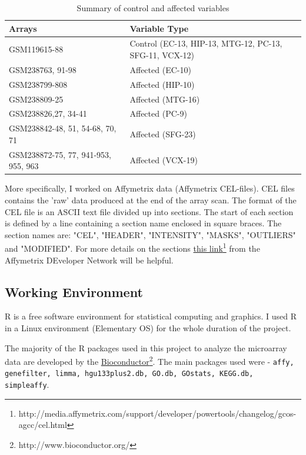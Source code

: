 \documentclass[oneside, a4paper, 11pt]{book}
\begin{document}
\begin{table}[h]
    \centering
    \begin{tabular}{ |l|p{}| }
        \hline
        Arrays & Variable Type\\
        \hline
        GSM119615-88 & Control (EC-13, HIP-13, MTG-12, PC-13, SFG-11, VCX-12)\\  
        GSM238763, 91-98 & Affected (EC-10) \\
        GSM238799-808 & Affected (HIP-10) \\
        GSM238809-25 & Affected (MTG-16) \\
        GSM238826,27, 34-41 & Affected (PC-9) \\
        GSM238842-48, 51, 54-68, 70, 71 & Affected (SFG-23) \\
        GSM238872-75, 77, 941-953, 955, 963 & Affected (VCX-19)\\
        \hline
    \end{tabular}
    \caption{Summary of control and affected variables}
    \label{vartab}
\end{table}

More specifically, I worked on Affymetrix data (Affymetrix CEL-files). CEL files contains the 'raw' data produced at the end of the array scan. The format of the CEL file is an ASCII text file divided up into sections. The start of each section is defined by a line containing a section name enclosed in square braces. The section names are: "CEL", "HEADER", "INTENSITY", "MASKS", "OUTLIERS" and "MODIFIED". For more details on the sections \href{http://media.affymetrix.com/support/developer/powertools/changelog/gcos-agcc/cel.html}{this link}\footnote{http://media.affymetrix.com/support/developer/powertools/changelog/gcos-agcc/cel.html} from the Affymetrix DEveloper Network will be helpful.

\subsection{Working Environment}
R is a free software environment for statistical computing and graphics. I used R in a Linux environment (Elementary OS) for the whole duration of the project.

The majority of the R packages used in this project to analyze the microarray data are developed by the \href{http://www.bioconductor.org/}{Bioconductor}\footnote{http://www.bioconductor.org/}. The main packages used were - \texttt{affy, genefilter, limma, hgu133plus2.db, GO.db, GOstats, KEGG.db, simpleaffy}.
\end{document}
